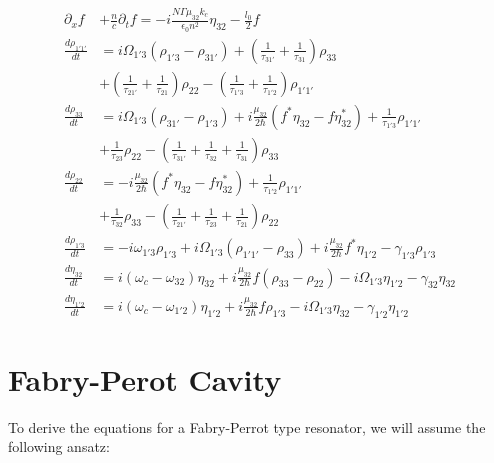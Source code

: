 \documentclass[10pt,english,fleqn]{article}%
\begin{document}
\begin{align}
\partial_{x}f &+\frac{n}{c}\partial_t f = -i\frac{N \Gamma \mu_{32} k_c}{\epsilon_0 n^2} \eta_{32} - \frac{l_0}{2} f \label{eq:rtwaveq} \\
\frac{d \rho_{1'1'}}{d t} &= i\Omega_{1'3} (\rho_{1'3} - \rho_{31'}) + (\frac{1}{\tau_{31'}} + \frac{1}{\tau_{31}})\rho_{33} \nonumber \\ 
& + (\frac{1}{\tau_{21'}} + \frac{1}{\tau_{21}})\rho_{22} - (\frac{1}{\tau_{1'3}} + \frac{1}{\tau_{1'2}})\rho_{1'1'} \\
\frac{d \rho_{33}}{d t}   &= i\Omega_{1'3} (\rho_{31'} - \rho_{1'3}) + i\frac{\mu_{32} }{2 \hbar} (f^* \eta_{32}-f\eta_{32}^*)+ \frac{1}{\tau_{1'3}} \rho_{1'1'} \nonumber \\ 
& +  \frac{1}{\tau_{23}}\rho_{22} - (\frac{1}{\tau_{31'}} + \frac{1}{\tau_{32}} + \frac{1}{\tau_{31}}) \rho_{33} \\
\frac{d \rho_{22}}{d t}   &= -i\frac{\mu_{32} }{2 \hbar} (f^* \eta_{32}-f\eta_{32}^*) + \frac{1}{\tau_{1'2}}\rho_{1'1'} \nonumber \\ 
& +  \frac{1}{\tau_{32}}\rho_{33} - (\frac{1}{\tau_{21'}} + \frac{1}{\tau_{23}} + \frac{1}{\tau_{21}}) \rho_{22} \\
\frac{d \rho_{1'3}}{d t}  &= -i\omega_{1'3}\rho_{1'3} +i \Omega_{1'3}(\rho_{1'1'} - \rho_{33}) +i\frac{\mu_{32}}{2\hbar}f^*\eta_{1'2} -\gamma_{1'3}\rho_{1'3} \\
\frac{d \eta_{32}}{d t}   &= i(\omega_c - \omega_{32})\eta_{32} +i \frac{\mu_{32}}{2\hbar}f(\rho_{33}-\rho_{22}) -i\Omega_{1'3}\eta_{1'2} - \gamma_{32}\eta_{32} \\
\frac{d \eta_{1'2}}{d t}  &= i(\omega_c - \omega_{1'2})\eta_{1'2} +i\frac{\mu_{32}}{2\hbar}f\rho_{1'3} -i\Omega_{1'3}\eta_{32} -\gamma_{1'2}\eta_{1'2} 
\end{align}
   


\section{Fabry-Perot Cavity} 

To derive the equations for a Fabry-Perrot type resonator, we will assume the following ansatz:
\end{document}
